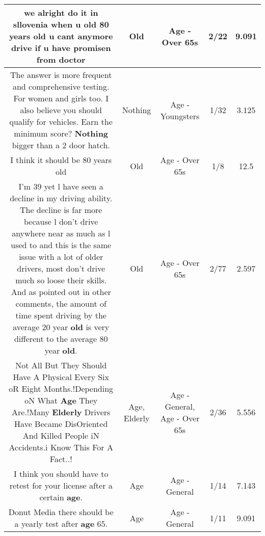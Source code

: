 \documentclass[11pt]{article}
\newlength\mylength
\begin{document}
\begin{center}
\begin{longtable}{|C{.65\mylength}|C{.30\mylength}|C{.12\mylength}|C{.12\mylength}|C{.12\mylength}|}
  \small we alright do it in sllovenia when u \textbf{old} 80 years \textbf{old} u cant anymore drive if u have promisen from doctor\normalsize   & Old & Age - Over 65s & 2/22 & 9.091 \\  \hline
  \small The answer is more frequent and comprehensive testing. For women and girls too. I also believe you should qualify for vehicles. Earn the minimum score? \textbf{Nothing} bigger than a 2 door hatch.\normalsize   & Nothing & Age - Youngsters & 1/32 & 3.125 \\  \hline
  \small I think it should be 80 years old\normalsize   & Old & Age - Over 65s & 1/8 & 12.5 \\  \hline
  \small I'm 39 yet l have seen a decline in my driving ability. The decline is far more because l don't drive anywhere near as much as l used to and this is the same issue with a lot of older drivers, most don't drive much so loose their skills. And as pointed out in other comments, the amount of time spent driving by the average 20 year \textbf{old} is very different to the average 80 year \textbf{old}.\normalsize   & Old & Age - Over 65s & 2/77 & 2.597 \\  \hline
  \small Not All But They Should Have A Physical Every Six oR Eight Months.!Depending oN What \textbf{Age} They Are.!Many \textbf{Elderly} Drivers Have Became DisOriented And Killed People iN Accidents.i Know This For A Fact..!\normalsize   & Age, Elderly & Age - General, Age - Over 65s & 2/36 & 5.556 \\  \hline
  \small I think you should have to retest for your license after a certain \textbf{age}.\normalsize   & Age & Age - General & 1/14 & 7.143 \\  \hline
  \small Donut Media there should be a yearly test after \textbf{age} 65.\normalsize   & Age & Age - General & 1/11 & 9.091 \\  \hline

\end{longtable}
\end{center}
\end{document}
